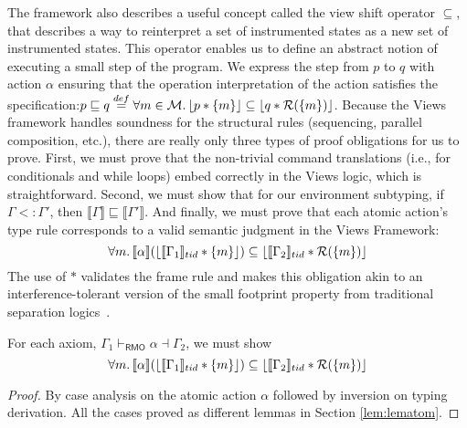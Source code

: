 The framework also describes a useful concept called the view shift operator $\subseteq$, that describes a way to reinterpret a set of instrumented states as a new set of instrumented states. This operator enables us to define an abstract notion of executing a small step of the program. We express the step from $p$ to $q$ with action $\alpha$ ensuring that the operation interpretation of the action satisfies the specification:$ p \sqsubseteq q \stackrel{def}{=} \forall m\in\mathcal{M} \ldotp \lfloor p * \{ m \} \rfloor \subseteq \lfloor q* \mathcal{R}(\{m\})\rfloor$. Because the Views framework handles soundness for the structural rules (sequencing, parallel composition, etc.), there are really only three types of proof obligations for us to prove.  First, we must prove that the non-trivial command translations (i.e., for conditionals and while loops) embed correctly in the Views logic, which is straightforward.  Second, we must show that for our environment subtyping, if $\Gamma<:\Gamma'$, then $\llbracket{\Gamma}\rrbracket\sqsubseteq\llbracket\Gamma'\rrbracket$.  And finally, we must prove that each atomic action's type rule corresponds to a valid semantic judgment in the Views Framework:
\[
\forall m\ldotp   \llbracket \alpha \rrbracket ( \lfloor \llbracket \Gamma_{1} \rrbracket_{tid}  * \{m\} \rfloor) \subseteq
  \lfloor \llbracket \Gamma_{2} \rrbracket_{tid} * \mathcal{R}(\{m\}) \rfloor
  \]
The use of $*$ validates the frame rule and makes this obligation akin to an interference-tolerant version of the small footprint property from traditional separation logics~\cite{Reynolds:2002:SLL:645683.664578,Calcagno:2007:LAA:1270399.1271718}.
\begin{lemma}
  \label{lem:axmsoundnessap}
For each axiom, $\Gamma_{1} \vdash_{\textsf{RMO}} \alpha \dashv \Gamma_{2}$, we must show
\[
\forall m\ldotp   \llbracket \alpha \rrbracket  (\lfloor \llbracket \Gamma_{1} \rrbracket_{tid}  * \{m\} \rfloor )\subseteq  \lfloor \llbracket \Gamma_{2} \rrbracket_{tid} * \mathcal{R}(\{m\}) \rfloor
\]
\end{lemma}
\begin{proof}
By case analysis on the atomic action $\alpha$ followed by inversion on typing derivation. All the cases proved as different lemmas in Section \ref{lem:lematom}.
\end{proof}

